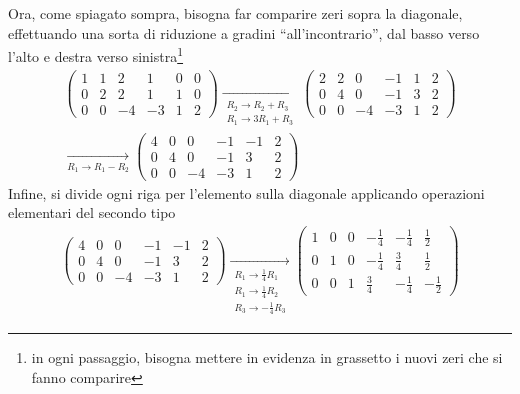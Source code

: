 Ora, come spiagato sompra, bisogna far comparire zeri sopra la diagonale, effettuando una sorta di
riduzione a gradini ``all'incontrario'', dal basso verso l'alto e destra verso sinistra\footnote{
  in ogni passaggio, bisogna mettere in evidenza in grassetto i nuovi zeri che si fanno comparire}
\begin{eqnarray*}
  \left(
  \begin{array}{ccc|ccc}
    1 & 1 & 2 & 1 & 0 & 0\\
    0 & 2 & 2 & 1 & 1 & 0\\
    0 & 0 & -4 & -3 & 1 & 2
  \end{array}\right) \underset{
  \begin{matrix}
    R_2\to R_2+R_3\\
    R_1\to 3R_1+R_3
  \end{matrix}
  }{\to}\left(
  \begin{array}{ccc|ccc}
    2 &2 & 0 & -1 & 1 & 2 \\
      0 & 4 &0 &-1 &3 &2 \\
      0 & 0 & -4 & -3 & 1&2
  \end{array}
  \right)\\
  \underset{
  R_1\to R_1-R_2
  }{\to}\left(
  \begin{array}{ccc|ccc}
    4 & 0 & 0 & -1 & -1 & 2 \\
    0 & 4 & 0 & -1 & 3 & 2 \\
    0 & 0 & -4 & -3 & 1 & 2 
  \end{array}
  \right)
\end{eqnarray*}
Infine, si divide ogni riga per l'elemento sulla diagonale applicando operazioni elementari
del secondo tipo
\begin{eqnarray*}
  \left(
  \begin{array}{ccc|ccc}
    4 & 0 & 0 & -1 & -1 & 2 \\
    0 & 4 & 0 & -1 & 3 & 2 \\
    0 & 0 & -4 & -3 & 1 & 2 
  \end{array}
  \right)\underset{
  \begin{matrix}
    R_1\to \frac{1}{4}R_1\\
    R_1\to \frac{1}{4}R_2\\
    R_3\to -\frac{1}{4}R_3
  \end{matrix}
  }{\to} \left(
  \begin{array}{ccc|ccc}
    1 & 0 & 0 & -\frac{1}{4} &-\frac{1}{4}&\frac{1}{2}\\
    0 & 1 & 0 & -\frac{1}{4} & \frac{3}{4} & \frac{1}{2}\\
    0 & 0 & 1 & \frac{3}{4} & -\frac{1}{4} & -\frac{1}{2}
  \end{array}
  \right)
\end{eqnarray*}
